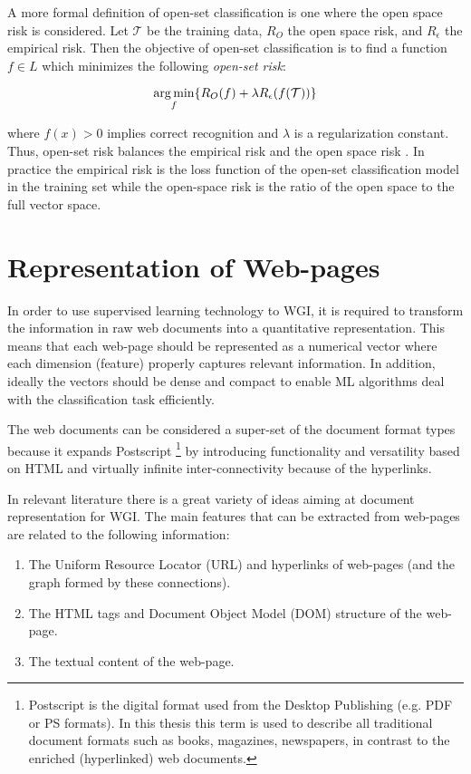 \begin{itemize}
A more formal definition of open-set classification is one where the open space risk is considered. Let $\mathcal{T}$ be the training data, $R_{O}$ the open space risk, and $R_{\epsilon}$ the empirical risk. Then the objective of open-set classification is to find a function $f \in L$ which minimizes the following \textit{open-set risk}: 

\begin{equation}
\operatorname*{arg\,min}_{f} \{R_{O}(f ) + \lambda R_{\epsilon}(f (\mathcal{T}))\}
\end{equation}

\noindent where $f (x) > 0$ implies correct recognition and $\lambda$ is a regularization constant. Thus, open-set risk balances the empirical risk and the open space risk \parencite{geng2018recent}. In practice the empirical risk is the loss function of the open-set classification model in the training set while the open-space risk is the ratio of the open space to the full vector space.

\section{Representation of Web-pages} \label{chap:introduction:sec:document_representation}

In order to use supervised learning technology to WGI, it is required to transform the information in raw web documents into a quantitative representation. This means that each web-page should be represented as a numerical vector where each dimension (feature) properly captures relevant information. In addition, ideally the vectors should be dense and compact to enable ML algorithms deal with the classification task efficiently. 

The web documents can be considered a super-set of the document format types because it expands Postscript \footnote{Postscript is the digital format used from the Desktop Publishing (e.g. PDF or PS formats). In this thesis this term is used to describe all traditional document formats such as books, magazines, newspapers, in contrast to the enriched (hyperlinked) web documents.} by introducing functionality and versatility based on HTML and virtually infinite inter-connectivity because of the hyperlinks. 

In relevant literature there is a great variety of ideas aiming at document representation for WGI. The main features that can be extracted from web-pages are related to the following information:

\begin{enumerate}
\item The Uniform Resource Locator (URL) and hyperlinks of web-pages (and the graph formed by these connections).
\item The HTML tags and Document Object Model (DOM) structure of the web-page. 
\item The textual content of the web-page.
\end{enumerate}


\end{itemize}
